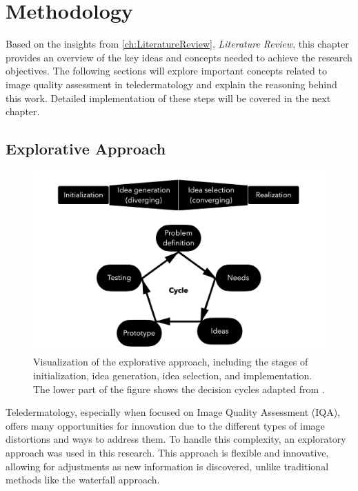 \chapter{Methodology}
\label{ch:Methodology}
Based on the insights from \autoref{ch:LiteratureReview}, \textit{Literature Review}, this chapter provides an overview of the key ideas and concepts needed to achieve the research objectives. The following sections will explore important concepts related to image quality assessment in teledermatology and explain the reasoning behind this work. Detailed implementation of these steps will be covered in the next chapter.\par

\section{Explorative Approach}
\label{sec:ExplorativeApproach}
\begin{figure}[ht]
    \centering
    \includegraphics[keepaspectratio,width=13cm]{img/DecisionCycle.jpg}
    \caption{Visualization of the explorative approach, including the stages of initialization, idea generation, idea selection, and implementation. The lower part of the figure shows the decision cycles adapted from \autocite{DesignThinking}.}
    \label{fig:decision_cycle}
\end{figure}
\noindent
Teledermatology, especially when focused on Image Quality Assessment (IQA), offers many opportunities for innovation due to the different types of image distortions and ways to address them. To handle this complexity, an exploratory approach was used in this research. This approach is flexible and innovative, allowing for adjustments as new information is discovered, unlike traditional methods like the waterfall approach. \par
